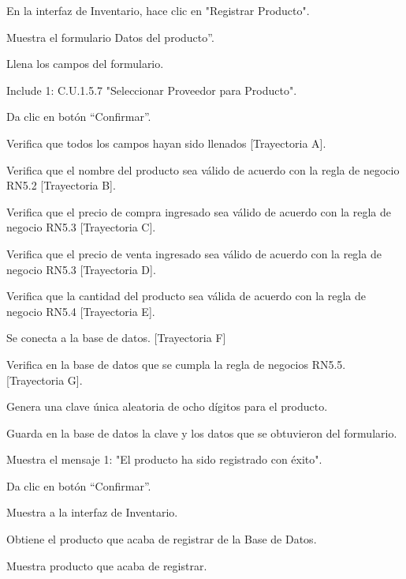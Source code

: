 \begin{UCtrayectoria}
	
	\UCpaso[\UCactor] En la interfaz de Inventario, hace clic en "Registrar Producto".
	
	\UCpaso[\UCsist] Muestra el formulario Datos del producto”.
	
	\UCpaso[\UCactor] Llena los campos del formulario.

	\UCpaso[] Include 1:  C.U.1.5.7 "Seleccionar Proveedor para Producto".
	
	\UCpaso[\UCactor] Da clic en botón “Confirmar”.

	\UCpaso[\UCsist] Verifica que todos los campos hayan sido llenados [Trayectoria A].

	\UCpaso[\UCsist] Verifica que el nombre del producto sea válido de acuerdo con la regla de negocio RN5.2 [Trayectoria B].

	\UCpaso[\UCsist] Verifica que el precio de compra ingresado sea válido de acuerdo con la regla de negocio RN5.3 [Trayectoria C].

	\UCpaso[\UCsist] Verifica que el precio de venta ingresado sea válido de acuerdo con la regla de negocio RN5.3 [Trayectoria D].
	
	\UCpaso[\UCsist] Verifica que la cantidad del producto sea válida de acuerdo con la regla de negocio RN5.4 [Trayectoria E].

	\UCpaso[\UCsist] Se conecta a la base de datos. [Trayectoria F]

	\UCpaso[\UCsist] Verifica en la base de datos que se cumpla la regla de negocios RN5.5. [Trayectoria G].

	\UCpaso[\UCsist] Genera una clave única aleatoria de ocho dígitos para el producto.
	
	\UCpaso[\UCsist] Guarda en la base de datos la clave y los datos que se obtuvieron del formulario.

	\UCpaso[\UCsist] Muestra el mensaje 1: "El producto ha sido registrado con éxito".

	\UCpaso[\UCactor] Da clic en botón “Confirmar”.

	\UCpaso[\UCsist] Muestra a la interfaz de Inventario.

	\UCpaso[\UCsist] Obtiene el producto que acaba de registrar de la Base de Datos.

	\UCpaso[\UCsist] Muestra producto que acaba de registrar.
	
\end{UCtrayectoria}


